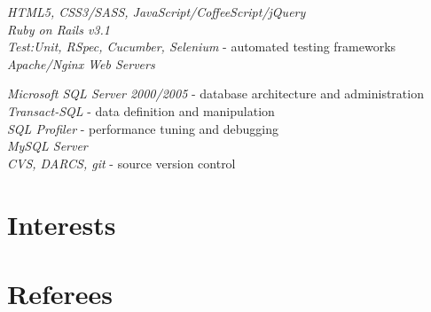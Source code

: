 \documentclass[10pt]{article} %
\begin{document}
{
{
\textit{HTML5, CSS3/SASS, JavaScript/CoffeeScript/jQuery}\\
\textit{Ruby on Rails v3.1}\\
\textit{Test:Unit, RSpec, Cucumber, Selenium} - automated testing frameworks\\
\textit{Apache/Nginx Web Servers}\\
}


{
\textit{Microsoft SQL Server 2000/2005} - database architecture and administration\\
\textit{Transact-SQL} - data definition and manipulation\\
\textit{SQL Profiler} - performance tuning and debugging\\
\textit{MySQL Server}\\
\textit{CVS, DARCS, git} - source version control
}


\section{Interests}



\section{Referees}

}
\end{document}
